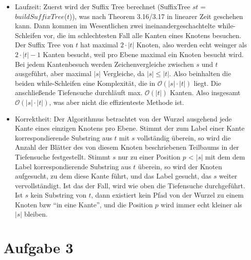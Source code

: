 \documentclass[a4paper,10pt,oneside,leqno]{scrartcl}
\begin{document}
\begin{itemize}
 \item Laufzeit: Zuerst wird der Suffix Tree berechnet (SuffixTree $st$ = $buildSuffixTree$($t$)), was nach Theorem 3.16/3.17 in linearer
 Zeit geschehen kann. Dann kommen im Wesentlichen zwei ineinandergeschachtelte while-Schleifen vor, die im schlechtesten Fall alle
 Kanten eines Knotens besuchen. Der Suffix Tree von $t$ hat maximal $2\cdot |t|$ Knoten, also werden echt weinger als $2\cdot |t|-1$ Kanten besucht,
 weil pro Ebene maximal ein Knoten besucht wird. Bei jedem Kantenbesuch werden Zeichenvergleiche zwischen $s$ und $t$ ausgeführt, aber maximal
 $|s|$ Vergleiche, da $|s| \leq |t|$. Also beinhalten die beiden while-Schleifen eine Komplexität, die in $\mathcal{O}(|s| \cdot |t|)$ liegt.
 Die anschließende Tiefensuche durchläuft max. $\mathcal{O}(|t|)$ Kanten. Also insgesamt $\mathcal{O}(|s| \cdot |t|)$, was aber nicht die effizienteste
 Methode ist. 
 
 \item Korrektheit: Der Algorithmus betrachtet von der Wurzel ausgehend jede Kante eines einzigen Knotens pro Ebene. Stimmt der zum Label einer Kante
 korrespondierende Substring aus $t$ mit $s$ vollständig überein, so wird die Anzahl der Blätter des von diesem Knoten beschriebenen Teilbaums in der
 Tiefensuche festgestellt. Stimmt $s$ nur zu einer Position $p$ < $|s|$ mit dem dem Label korrespondierende Substring aus $t$ überein, so wird der Knoten
 aufgesucht, zu dem diese Kante führt, und das Label gesucht, das $s$ weiter vervollständigt. Ist das der Fall, wird wie oben die Tiefensuche durchgeführt.
 Ist $s$ kein Substring von $t$, dann existiert kein Pfad von der Wurzel zu einem Knoten bzw ``in eine Kante'', und die Position $p$ wird immer echt
 kleiner als $|s|$ bleiben.
\end{itemize}

\section*{Aufgabe 3}
\end{document}

